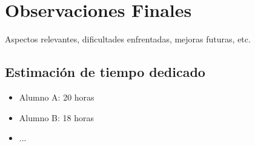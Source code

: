 \section*{Observaciones Finales}

Aspectos relevantes, dificultades enfrentadas, mejoras futuras, etc.

\subsection*{Estimación de tiempo dedicado}

\begin{itemize}
    \item Alumno A: 20 horas
    \item Alumno B: 18 horas
    \item ...
\end{itemize}

